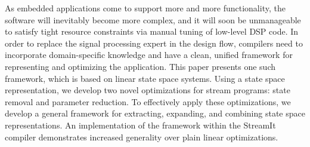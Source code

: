 \label{sec:conclusion}

As embedded applications come to support more and more functionality,
the software will inevitably become more complex, and it will soon be
unmanageable to satisfy tight resource constraints via manual tuning
of low-level DSP code.  In order to replace the signal processing
expert in the design flow, compilers need to incorporate
domain-specific knowledge and have a clean, unified framework for
representing and optimizing the application.  This paper presents one
such framework, which is based on linear state space systems.  Using a
state space representation, we develop two novel optimizations for
stream programs: state removal and parameter reduction.  To
effectively apply these optimizations, we develop a general framework
for extracting, expanding, and combining state space representations.
An implementation of the framework within the StreamIt compiler
demonstrates increased generality over plain linear optimizations.





